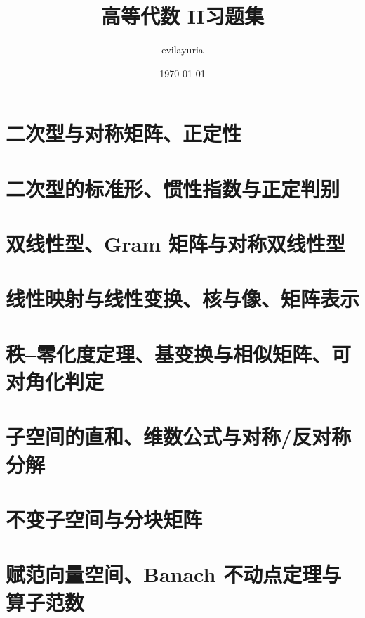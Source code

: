 \documentclass[11pt,a4paper]{ctexart}
\begin{document}
\title{高等代数 II\quad 习题集}
\author{evilayuria }
\date{\today}
\maketitle

\tableofcontents
\newpage

\section{二次型与对称矩阵、正定性}


\newpage
\section{二次型的标准形、惯性指数与正定判别}


\newpage
\section{双线性型、Gram 矩阵与对称双线性型}


\newpage
\section{线性映射与线性变换、核与像、矩阵表示}


\newpage
\section{秩--零化度定理、基变换与相似矩阵、可对角化判定}


\newpage
\section{子空间的直和、维数公式与对称/反对称分解}


\newpage
\section{不变子空间与分块矩阵}


\newpage
\section{赋范向量空间、Banach 不动点定理与算子范数}

\end{document}
